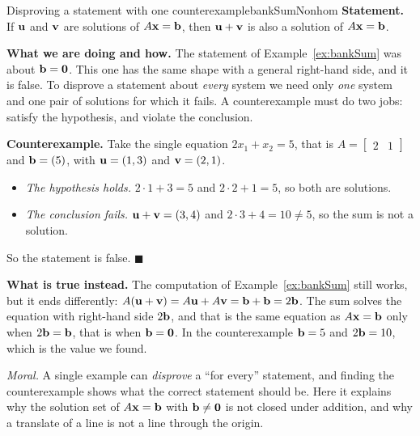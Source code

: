 \documentclass[11pt]{article}
\begin{document}
\begin{exmp}{Disproving a statement with one counterexample}{bankSumNonhom}
\textbf{Statement.} If $\mathbf{u}$ and $\mathbf{v}$ are solutions of $A\mathbf{x}=\mathbf{b}$, then $\mathbf{u}+\mathbf{v}$ is also a solution of $A\mathbf{x}=\mathbf{b}$.

\textbf{What we are doing and how.} The statement of Example~\ref{ex:bankSum} was about $\mathbf{b}=\mathbf{0}$. This one has the same shape with a general right-hand side, and it is false. To disprove a statement about \emph{every} system we need only \emph{one} system and one pair of solutions for which it fails. A counterexample must do two jobs: satisfy the hypothesis, and violate the conclusion.

\textbf{Counterexample.} Take the single equation $2x_1+x_2=5$, that is $A=\begin{bmatrix}2&1\end{bmatrix}$ and $\mathbf{b}=(5)$, with $\mathbf{u}=(1,3)$ and $\mathbf{v}=(2,1)$.
\begin{itemize}
  \item \emph{The hypothesis holds.} $2\cdot1+3=5$ and $2\cdot2+1=5$, so both are solutions.
  \item \emph{The conclusion fails.} $\mathbf{u}+\mathbf{v}=(3,4)$ and $2\cdot3+4=10\neq5$, so the sum is not a solution.
\end{itemize}
So the statement is false. \qquad$\blacksquare$

\textbf{What is true instead.} The computation of Example~\ref{ex:bankSum} still works, but it ends differently: $A(\mathbf{u}+\mathbf{v})=A\mathbf{u}+A\mathbf{v}=\mathbf{b}+\mathbf{b}=2\mathbf{b}$. The sum solves the equation with right-hand side $2\mathbf{b}$, and that is the same equation as $A\mathbf{x}=\mathbf{b}$ only when $2\mathbf{b}=\mathbf{b}$, that is when $\mathbf{b}=\mathbf{0}$. In the counterexample $\mathbf{b}=5$ and $2\mathbf{b}=10$, which is the value we found.

\emph{Moral.} A single example can \emph{disprove} a ``for every'' statement, and finding the counterexample shows what the correct statement should be. Here it explains why the solution set of $A\mathbf{x}=\mathbf{b}$ with $\mathbf{b}\neq\mathbf{0}$ is not closed under addition, and why a translate of a line is not a line through the origin.
\end{exmp}
\end{document}

